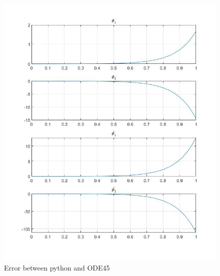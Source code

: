 \documentclass{beamer}
\begin{document}
\begin{frame}
\begin{itemize}
\begin{figure}
\begin{multicols}{2}
                    \includegraphics[scale=.18]{Figs/linear_error_ode45.jpg}
                    \caption{Error between python and ODE45}
                \end{multicols}
            \end{figure}
        \end{itemize}
    \end{frame}
\end{document}
